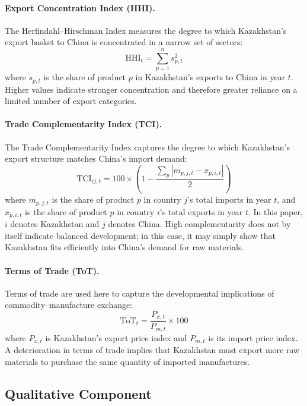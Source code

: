 \documentclass[12pt]{article}
\begin{document}
\paragraph{Export Concentration Index (HHI).}
The Herfindahl--Hirschman Index measures the degree to which Kazakhstan's export basket to China is concentrated in a narrow set of sectors:
\begin{equation}
\text{HHI}_t = \sum_{p=1}^{n} s_{p,t}^2
\end{equation}
\noindent where $s_{p,t}$ is the share of product $p$ in Kazakhstan's exports to China in year $t$. Higher values indicate stronger concentration and therefore greater reliance on a limited number of export categories.

\paragraph{Trade Complementarity Index (TCI).}
The Trade Complementarity Index captures the degree to which Kazakhstan's export structure matches China's import demand:
\begin{equation}
\text{TCI}_{ij,t} = 100 \times \left(1 - \frac{\sum_{p}\left|m_{p,j,t} - x_{p,i,t}\right|}{2}\right)
\end{equation}
\noindent where $m_{p,j,t}$ is the share of product $p$ in country $j$'s total imports in year $t$, and $x_{p,i,t}$ is the share of product $p$ in country $i$'s total exports in year $t$. In this paper, $i$ denotes Kazakhstan and $j$ denotes China. High complementarity does not by itself indicate balanced development; in this case, it may simply show that Kazakhstan fits efficiently into China's demand for raw materials.

\paragraph{Terms of Trade (ToT).}
Terms of trade are used here to capture the developmental implications of commodity--manufacture exchange:
\begin{equation}
\text{ToT}_t = \frac{P_{x,t}}{P_{m,t}} \times 100
\end{equation}
\noindent where $P_{x,t}$ is Kazakhstan's export price index and $P_{m,t}$ is its import price index. A deterioration in terms of trade implies that Kazakhstan must export more raw materials to purchase the same quantity of imported manufactures.

\subsection{Qualitative Component}
\end{document}
